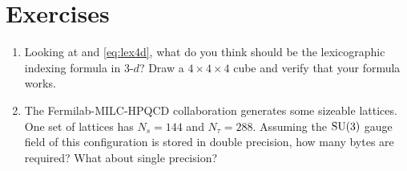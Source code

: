 \section*{Exercises}
\begin{enumerate}
  \item Looking at  and \eqref{eq:lex4d}, what do you think
should be the lexicographic indexing formula in 3-$d$? Draw a $4\times4\times4$
cube and verify that your formula works.
  \item The Fermilab-MILC-HPQCD collaboration generates some sizeable lattices.
One set of lattices has $N_s=144$ and $N_\tau=288$. Assuming the $\operatorname{SU}(3)$ gauge
field of this configuration is stored in
double precision, how many bytes are required? What about single precision?
\end{enumerate}




